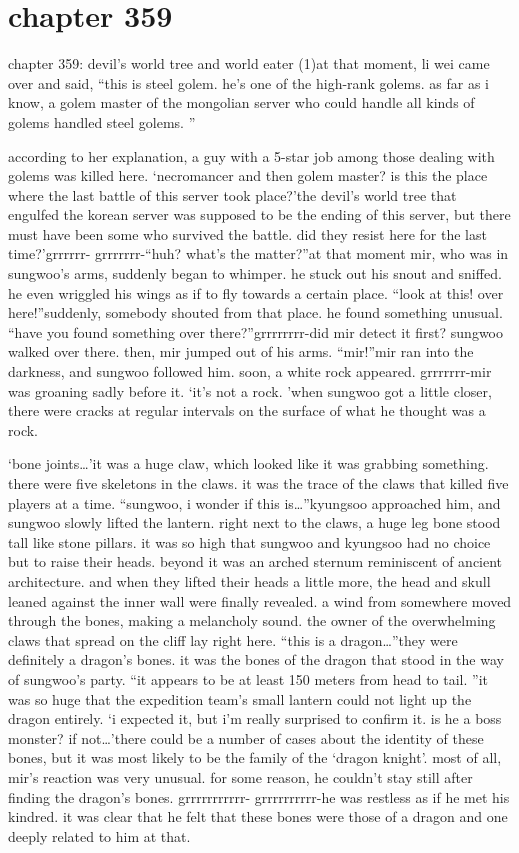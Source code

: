 \section{chapter 359}

chapter 359: devil’s world tree and world eater (1)at that moment, li wei came over and said, “this is steel golem.
 he’s one of the high-rank golems.
 as far as i know, a golem master of the mongolian server who could handle all kinds of golems handled steel golems.
”




according to her explanation, a guy with a 5-star job among those dealing with golems was killed here.
‘necromancer and then golem master? is this the place where the last battle of this server took place?’the devil’s world tree that engulfed the korean server was supposed to be the ending of this server, but there must have been some who survived the battle.
 did they resist here for the last time?’grrrrrr- grrrrrrr-“huh? what’s the matter?”at that moment mir, who was in sungwoo’s arms, suddenly began to whimper.
 he stuck out his snout and sniffed.
 he even wriggled his wings as if to fly towards a certain place.
“look at this! over here!”suddenly, somebody shouted from that place.
 he found something unusual.
“have you found something over there?”grrrrrrrr-did mir detect it first? sungwoo walked over there.
 then, mir jumped out of his arms.
“mir!”mir ran into the darkness, and sungwoo followed him.
 soon, a white rock appeared.
grrrrrrr-mir was groaning sadly before it.
‘it’s not a rock.
’when sungwoo got a little closer, there were cracks at regular intervals on the surface of what he thought was a rock.

‘bone joints…’it was a huge claw, which looked like it was grabbing something.
 there were five skeletons in the claws.
 it was the trace of the claws that killed five players at a time.
“sungwoo, i wonder if this is…”kyungsoo approached him, and sungwoo slowly lifted the lantern.
 right next to the claws, a huge leg bone stood tall like stone pillars.
 it was so high that sungwoo and kyungsoo had no choice but to raise their heads.
beyond it was an arched sternum reminiscent of ancient architecture.
 and when they lifted their heads a little more, the head and skull leaned against the inner wall were finally revealed.
a wind from somewhere moved through the bones, making a melancholy sound.
the owner of the overwhelming claws that spread on the cliff lay right here.
“this is a dragon…”they were definitely a dragon’s bones.
it was the bones of the dragon that stood in the way of sungwoo’s party.
“it appears to be at least 150 meters from head to tail.
”it was so huge that the expedition team’s small lantern could not light up the dragon entirely.
‘i expected it, but i’m really surprised to confirm it.
 is he a boss monster? if not…’there could be a number of cases about the identity of these bones, but it was most likely to be the family of the ‘dragon knight’.
most of all, mir’s reaction was very unusual.
 for some reason, he couldn’t stay still after finding the dragon’s bones.
grrrrrrrrrrr- grrrrrrrrrr-he was restless as if he met his kindred.
 it was clear that he felt that these bones were those of a dragon and one deeply related to him at that.

